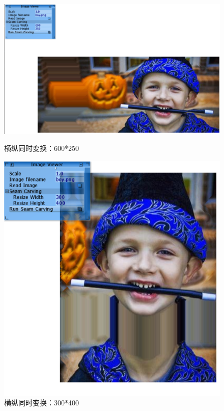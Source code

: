 \documentclass{article}
\begin{document}
\begin{figure}[htbp]
    \centering
    \begin{minipage}[t]{0.4\linewidth}
      \centering
      \includegraphics[width=\linewidth]{3.png}
      \caption{横纵同时变换：600*250}
      \label{fig:image3}
    \end{minipage}
    \hfill
    \begin{minipage}[t]{0.4\linewidth}
      \centering
      \includegraphics[width=\linewidth]{4.png}
      \caption{横纵同时变换：300*400}
      \label{fig:image4}
    \end{minipage}

  \end{figure}
\end{document}
